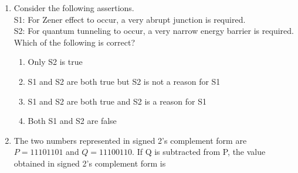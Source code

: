 \documentclass[a4paper, 11pt]{article}
\begin{document}
\begin{enumerate}
    \hfill{}
    
    \item Consider the following assertions.\\
    S1: For Zener effect to occur, a very abrupt junction is required.\\S2: For quantum tunneling to occur, a very narrow energy barrier is required.\\Which of the following is correct?
    \begin{enumerate}
        \item Only S2 is true
        \item S1 and S2 are both true but S2 is not a reason for S1
        \item S1 and S2 are both true and S2 is a reason for S1
        \item Both S1 and S2 are false
    \end{enumerate}
    
    \hfill{}
    
    \item The two numbers represented in signed 2's complement form are $P=11101101$ and $Q=11100110$. If Q is subtracted from P, the value obtained in signed 2's complement form is
    \begin{enumerate}
    \end{enumerate}

    \hfill{}


\end{enumerate}
\end{document}
